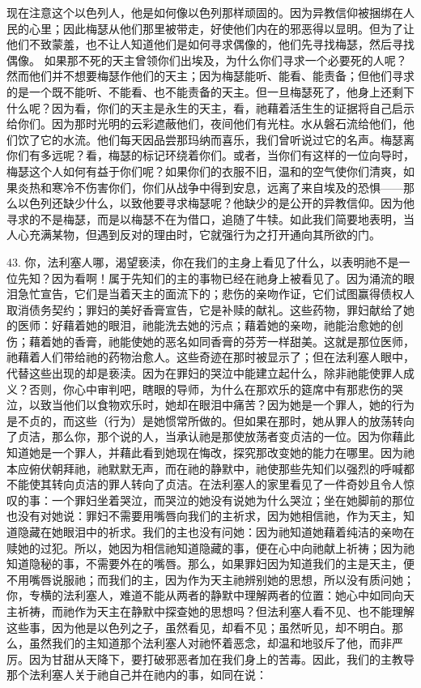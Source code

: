 现在注意这个以色列人，他是如何像以色列那样顽固的。因为异教信仰被捆绑在人民的心里；因此梅瑟从他们那里被带走，好使他们内在的邪恶得以显明。但为了让他们不致蒙羞，也不让人知道他们是如何寻求偶像的，他们先寻找梅瑟，然后寻找偶像。 如果那不死的天主曾领你们出埃及，为什么你们寻求一个必要死的人呢？然而他们并不想要梅瑟作他们的天主；因为梅瑟能听、能看、能责备；但他们寻求的是一个既不能听、不能看、也不能责备的天主。但一旦梅瑟死了，他身上还剩下什么呢？因为看，你们的天主是永生的天主，看，祂藉着活生生的证据将自己启示给你们。因为那时光明的云彩遮蔽他们，夜间他们有光柱。水从磐石流给他们，他们饮了它的水流。他们每天因品尝那玛纳而喜乐，我们曾听说过它的名声。梅瑟离你们有多远呢？看，梅瑟的标记环绕着你们。或者，当你们有这样的一位向导时，梅瑟这个人如何有益于你们呢？如果你们的衣服不旧，温和的空气使你们清爽，如果炎热和寒冷不伤害你们，你们从战争中得到安息，远离了来自埃及的恐惧——那么以色列还缺少什么，以致他要寻求梅瑟呢？他缺少的是公开的异教信仰。因为他寻求的不是梅瑟，而是以梅瑟不在为借口，追随了牛犊。如此我们简要地表明，当人心充满某物，但遇到反对的理由时，它就强行为之打开通向其所欲的门。\par

43. 你，法利塞人哪，渴望亵渎，你在我们的主身上看见了什么，以表明祂不是一位先知？因为看啊！属于先知们的主的事物已经在祂身上被看见了。因为涌流的眼泪急忙宣告，它们是当着天主的面流下的；悲伤的亲吻作证，它们试图赢得债权人取消债务契约；罪妇的美好香膏宣告，它是补赎的献礼。这些药物，罪妇献给了她的医师：好藉着她的眼泪，祂能洗去她的污点；藉着她的亲吻，祂能治愈她的创伤；藉着她的香膏，祂能使她的恶名如同香膏的芬芳一样甜美。这就是那位医师，祂藉着人们带给祂的药物治愈人。这些奇迹在那时被显示了；但在法利塞人眼中，代替这些出现的却是亵渎。因为在罪妇的哭泣中能建立起什么，除非祂能使罪人成义？否则，你心中审判吧，瞎眼的导师，为什么在那欢乐的筵席中有那悲伤的哭泣，以致当他们以食物欢乐时，她却在眼泪中痛苦？因为她是一个罪人，她的行为是不贞的，而这些（行为）是她惯常所做的。但如果在那时，她从罪人的放荡转向了贞洁，那么你，那个说的人，当承认祂是那使放荡者变贞洁的一位。因为你藉此知道她是一个罪人，并藉此看到她现在悔改，探究那改变她的能力在哪里。因为祂本应俯伏朝拜祂，祂默默无声，而在祂的静默中，祂使那些先知们以强烈的呼喊都不能使其转向贞洁的罪人转向了贞洁。在法利塞人的家里看见了一件奇妙且令人惊叹的事：一个罪妇坐着哭泣，而哭泣的她没有说她为什么哭泣；坐在她脚前的那位也没有对她说：罪妇不需要用嘴唇向我们的主祈求，因为她相信祂，作为天主，知道隐藏在她眼泪中的祈求。我们的主也没有问她：因为祂知道她藉着纯洁的亲吻在赎她的过犯。所以，她因为相信祂知道隐藏的事，便在心中向祂献上祈祷；因为祂知道隐秘的事，不需要外在的嘴唇。那么，如果罪妇因为知道我们的主是天主，便不用嘴唇说服祂；而我们的主，因为作为天主祂辨别她的思想，所以没有质问她；你，专横的法利塞人，难道不能从两者的静默中理解两者的位置：她心中如同向天主祈祷，而祂作为天主在静默中探查她的思想吗？但法利塞人看不见、也不能理解这些事，因为他是以色列之子，虽然看见，却看不见；虽然听见，却不明白。那么，虽然我们的主知道那个法利塞人对祂怀着恶念，却温和地驳斥了他，而非严厉。因为甘甜从天降下，要打破邪恶者加在我们身上的苦毒。因此，我们的主教导那个法利塞人关于祂自己并在祂内的事，如同在说：\par


